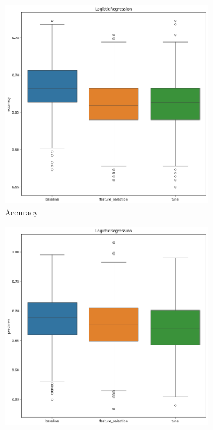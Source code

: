 \documentclass[12pt]{article}
\begin{document}
\begin{figure}[H]
    \centering
    \begin{subfigure}{0.31\textwidth}
        \centering
        \includegraphics[width=\linewidth]{ims/logreg_accuracy.png}
        \caption{Accuracy}
        \label{fig:logreg_acc}
    \end{subfigure}
    \begin{subfigure}{0.31\textwidth}
        \centering
        \includegraphics[width=\linewidth]{ims/logreg_precision.png}

\end{subfigure}
\end{figure}
\end{document}
